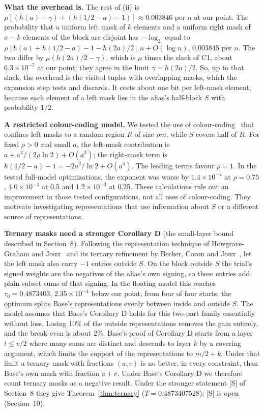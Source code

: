 \documentclass[11pt]{article}
\theoremstyle{plain}
\begin{document}
\textbf{What the overhead is.} The rest of (ii) is $\mu[(h(a) - \gamma) + (h(1/2 - a) - 1)]\approx0.003846$ per $n$ at our point. The probability that a uniform left mask of $k$ elements and a uniform right mask of $\sigma - k$ elements of the block are disjoint has $-\log_2$ equal to $\mu[h(a) + h(1/2 - a) - 1 - h(2a)/2]\,n + O(\log n)$, 0.003845 per $n$. The two differ by $\mu(h(2a)/2 - \gamma)$, which is $\mu$ times the slack of C1, about $6.3\times10^{-7}$ at our point; they agree in the limit $\gamma = h(2a)/2$. So, up to that slack, the overhead is the visited tuples with overlapping masks, which the expansion step tests and discards. It costs about one bit per left-mask element, because each element of a left mask lies in the alias's half-block $S$ with probability $1/2$.

\textbf{A restricted colour-coding model.} We tested the use of colour-coding~\cite{ayz} that confines left masks to a random region $R$ of size $\rho m$, while $S$ covers half of $R$. For fixed $\rho>0$ and small $a$, the left-mask contribution is $a+a^2/(2\rho\ln2)+O(a^3)$; the right-mask term is $h(1/2-a)-1=-2a^2/\ln2+O(a^4)$. The leading terms favour $\rho=1$. In the tested full-model optimizations, the exponent was worse by $1.4\times10^{-4}$ at $\rho=0.75$, $4.0\times10^{-4}$ at 0.5 and $1.2\times10^{-3}$ at 0.25. These calculations rule out an improvement in those tested configurations, not all uses of colour-coding. They motivate investigating representations that use information about $S$ or a different source of representations.

\textbf{Ternary masks need a stronger Corollary D} (the small-layer bound described in Section~8). Following the representation technique of Howgrave-Graham and Joux~\cite{hgj} and its ternary refinement by Becker, Coron and Joux~\cite{bcj}, let the left mask also carry $-1$ entries outside $S$. On the block outside $S$ the trial's signed weights are the negatives of the alias's own signing, so these entries add plain subset sums of that signing. In the floating model this reaches $\tau_0 = 0.4873403$, $2.35\times10^{-4}$ below our point, from four of four starts; the optimum splits Base's representations evenly between inside and outside $S$. The model assumes that Base's Corollary D holds for this two-part family essentially without loss. Losing 10\% of the outside representations removes the gain entirely, and the break-even is about 2\%. Base's proof of Corollary D starts from a layer $t \le v/2$ where many sums are distinct and descends to layer $k$ by a covering argument, which limits the support of the representations to $m/2 + k$. Under that limit a ternary mask with fractions $(a, c)$ is no better, in every constraint, than Base's own mask with fraction $a + c$. Under Base's Corollary D we therefore count ternary masks as a negative result. Under the stronger statement [S] of Section~8 they give Theorem~\ref{thm:ternary} ($T = 0.4873407528$); [S] is open (Section~10).
\end{document}
